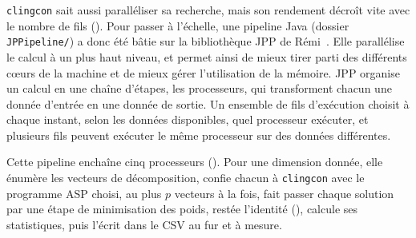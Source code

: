 \documentclass[12pt, a4paper]{article}
\begin{document}
\texttt{clingcon} sait aussi paralléliser sa recherche, mais son rendement décroît vite avec le nombre de fils ().
Pour passer à l'échelle, une pipeline Java (dossier \texttt{JPPipeline/}) a donc été bâtie sur la bibliothèque JPP de Rémi~\cite{segretain2023}.
Elle parallélise le calcul à un plus haut niveau, et permet ainsi de mieux tirer parti des différents cœurs de la machine et de mieux gérer l'utilisation de la mémoire.
JPP organise un calcul en une chaîne d'étapes, les processeurs, qui transforment chacun une donnée d'entrée en une donnée de sortie.
Un ensemble de fils d'exécution choisit à chaque instant, selon les données disponibles, quel processeur exécuter, et plusieurs fils peuvent exécuter le même processeur sur des données différentes.

Cette pipeline enchaîne cinq processeurs ().
Pour une dimension donnée, elle énumère les vecteurs de décomposition, confie chacun à \texttt{clingcon} avec le programme ASP choisi, au plus $p$ vecteurs à la fois, fait passer chaque solution par une étape de minimisation des poids, restée l'identité (), calcule ses statistiques, puis l'écrit dans le CSV au fur et à mesure.
\end{document}
